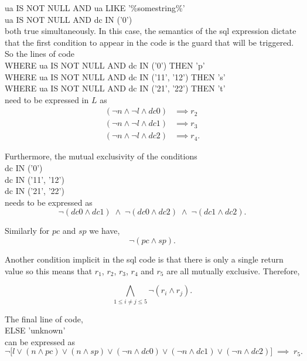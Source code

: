 \documentclass[../MathsNotesBase.tex]{subfiles}
\begin{document}
{\begin{exe}
			ua IS NOT NULL AND ua LIKE '\%somestring\%' \\
			ua IS NOT NULL AND dc IN ('0') \\
			
			both true simultaneously. In this case, the semantics of the sql expression dictate that the first condition to appear in the code is the guard that will be triggered. So the lines of code\\
			
			WHERE ua IS NOT NULL AND dc IN ('0') THEN 'p' \\
			WHERE ua IS NOT NULL AND dc IN ('11', '12') THEN 's' \\
			WHERE ua IS NOT NULL AND dc IN ('21', '22') THEN 't' \\
			
			need to be expressed in $L$ as
			\[\begin{aligned}
				(\lnot n \land \lnot l \land dc0) &\implies r_2 \\
				(\lnot n \land \lnot l \land dc1) &\implies r_3 \\
				(\lnot n \land \lnot l \land dc2) &\implies r_4.
			\end{aligned}\]
		
			Furthermore, the mutual exclusivity of the conditions\\
			
			dc IN ('0') \\
			dc IN ('11', '12') \\
			dc IN ('21', '22') \\
			
			needs to be expressed as
			\[ \lnot(dc0 \land dc1) \; \land \; \lnot(dc0 \land dc2) \; \land \; \lnot(dc1 \land dc2). \]
			
			Similarly for $pc$ and $sp$ we have,
			\[ \lnot(pc \land sp). \]
		
			\nl[4]
			Another condition implicit in the sql code is that there is only a single return value so this means that $r_1$, $r_2$, $r_3$, $r_4$ and $r_5$ are all mutually exclusive. Therefore,
			
			\[ \bigwedge_{1 \leq i \neq j \leq 5} \lnot(r_i \land r_j). \]
			
			\nl[4]
			The final line of code,\\
			
			ELSE 'unknown'\\
			
			can be expressed as
			\[ \lnot \big[ l \lor (n \land pc) \lor (n \land sp) \lor (\lnot n \land dc0) \lor (\lnot n \land dc1) \lor (\lnot n \land dc2) \big] \; \implies \; r_5. \]
			

\end{exe}}
\end{document}
